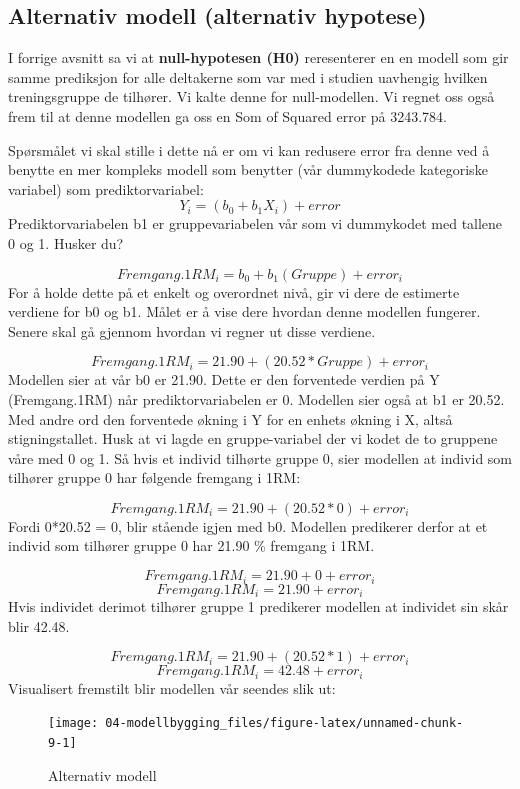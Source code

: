 \documentclass[
]{book}
\begin{document}
\hypertarget{alternativ-modell-alternativ-hypotese}{%
\subsection{Alternativ modell (alternativ hypotese)}\label{alternativ-modell-alternativ-hypotese}}

I forrige avsnitt sa vi at \textbf{null-hypotesen (H0)} reresenterer en en modell som gir samme prediksjon for alle deltakerne som var med i studien uavhengig hvilken treningsgruppe de tilhører. Vi kalte denne for null-modellen. Vi regnet oss også frem til at denne modellen ga oss en Som of Squared error på 3243.784.

Spørsmålet vi skal stille i dette nå er om vi kan redusere error fra denne ved å benytte en mer kompleks modell som benytter (vår dummykodede kategoriske variabel) som prediktorvariabel:
\[
Y_i = (b_0 + b_1X_i) + error
\]
Prediktorvariabelen b1 er gruppevariabelen vår som vi dummykodet med tallene 0 og 1. Husker du?

\[
Fremgang.1RM_i = b_0 + b_1(Gruppe) + error_i
\]
For å holde dette på et enkelt og overordnet nivå, gir vi dere de estimerte verdiene for b0 og b1. Målet er å vise dere hvordan denne modellen fungerer. Senere skal gå gjennom hvordan vi regner ut disse verdiene.

\[
Fremgang.1RM_i = 21.90 + (20.52*Gruppe) + error_i
\]
Modellen sier at vår b0 er 21.90. Dette er den forventede verdien på Y (Fremgang.1RM) når prediktorvariabelen er 0. Modellen sier også at b1 er 20.52. Med andre ord den forventede økning i Y for en enhets økning i X, altså stigningstallet. Husk at vi lagde en gruppe-variabel der vi kodet de to gruppene våre med 0 og 1. Så hvis et individ tilhørte gruppe 0, sier modellen at individ som tilhører gruppe 0 har følgende fremgang i 1RM:

\[
Fremgang.1RM_i = 21.90 + (20.52*0) + error_i
\]
Fordi 0*20.52 = 0, blir stående igjen med b0. Modellen predikerer derfor at et individ som tilhører gruppe 0 har 21.90 \% fremgang i 1RM.

\[
Fremgang.1RM_i = 21.90 + 0 + error_i
\]
\[
Fremgang.1RM_i = 21.90 + error_i
\]
Hvis individet derimot tilhører gruppe 1 predikerer modellen at individet sin skår blir 42.48.

\[
Fremgang.1RM_i = 21.90 + (20.52*1) + error_i
\]
\[
Fremgang.1RM_i = 42.48 + error_i
\]
Visualisert fremstilt blir modellen vår seendes slik ut:

\begin{figure}

{\centering \texttt{[image: 04-modellbygging\_files/figure-latex/unnamed-chunk-9-1]} 

}

\caption{Alternativ modell}\label{fig:unnamed-chunk-9}
\end{figure}
\end{document}
